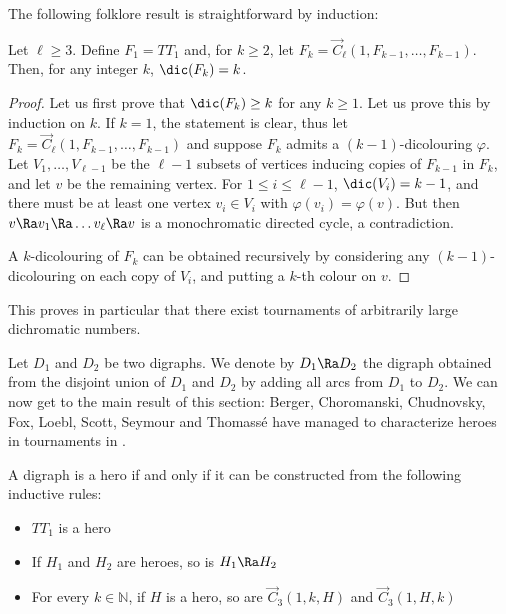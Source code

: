 The following folklore result is straightforward by induction:

\begin{theorem}\label{thm:tournaments_unbounded}
Let $\ell \geq 3$. Define $F_1 = TT_1$ and, for $k \geq 2$, let $F_k = \vec C_{\ell}(1, F_{k-1}, \dots, F_{k-1})$. Then, for any integer $k$, $\dic(F_k) = k$.
\end{theorem}

\begin{proof}

Let us first prove that $\dic(F_k) \geq k$ for any $k \geq 1$. Let us prove this by induction on $k$. If $k=1$, the statement is clear, thus let $F_k = \vec C_{\ell}(1, F_{k-1}, \dots, F_{k-1})$ and suppose $F_k$ admits a $(k-1)$-dicolouring $\varphi$. Let $V_1, \dots, V_{\ell - 1}$ be the $\ell - 1$ subsets of vertices inducing copies of $F_{k-1}$ in $F_k$, and let $v$ be the remaining vertex. For $1 \leq i \leq \ell - 1$,  $\dic(V_i) = k-1$, and there must be at least one vertex $v_i \in V_i$ with $\varphi(v_i) = \varphi(v)$. But then $v \Ra v_1 \Ra \dots v_{\ell} \Ra v$ is a monochromatic directed cycle, a contradiction.

A $k$-dicolouring of $F_k$ can be obtained recursively by considering any $(k-1)$-dicolouring on each copy of $V_i$, and putting a $k$-th colour on $v$.
\end{proof}

This proves in particular that there exist tournaments of arbitrarily large dichromatic numbers. 

\medskip

Let $D_1$ and $D_2$ be two digraphs. We denote by $D_1 \Ra D_2$ the digraph obtained from the disjoint union of $D_1$ and $D_2$ by adding all arcs from $D_1$ to $D_2$. We can now get to the main result of this section: Berger, Choromanski, Chudnovsky, Fox, Loebl, Scott, Seymour and Thomassé have managed to characterize heroes in tournaments in \cite{hero}.

\begin{theorem}
A digraph is a hero if and only if it can be constructed from the following inductive rules:
\begin{itemize}
    \item $TT_1$ is a hero
    \item If $H_1$ and $H_2$ are heroes, so is $H_1 \Ra H_2$
    \item For every $k \in \mathbb{N}$, if $H$ is a hero, so are $\vec C_{3}(1,k,H)$ and $\vec C_{3}(1,H,k)$
\end{itemize}
\end{theorem}


